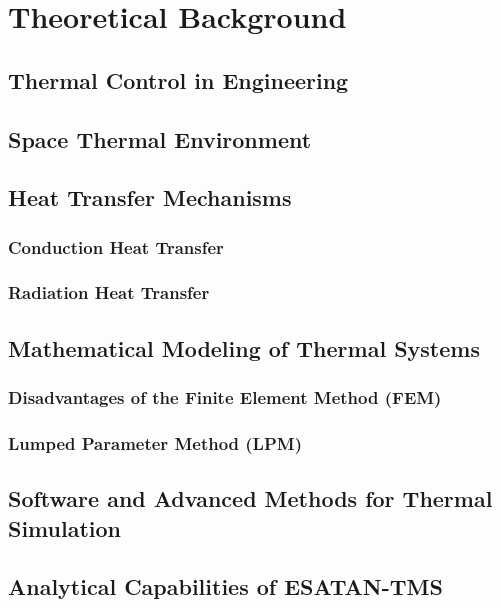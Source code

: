 \chapter{Theoretical Background} \label{ch:chapter_04}
\section{Thermal Control in Engineering}
\section{Space Thermal Environment}
\section{Heat Transfer Mechanisms}
\subsection{Conduction Heat Transfer}
\subsection{Radiation Heat Transfer}
\section{Mathematical Modeling of Thermal Systems}
\subsection{Disadvantages of the Finite Element Method (FEM)}
\subsection{Lumped Parameter Method (LPM)}
\section{Software and Advanced Methods for Thermal Simulation}
\section{Analytical Capabilities of ESATAN-TMS}